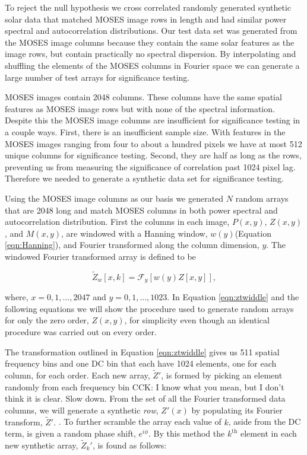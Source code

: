 \documentclass[]{solarphysics}
\newcommand{\cck}[1]{{\color{red} CCK: #1}} %
\begin{document}
\begin{article}
	To reject the null hypothesis we cross correlated randomly generated synthetic solar data that matched MOSES image rows in length and had similar power spectral and autocorrelation distributions.  Our test data set was generated from the MOSES image columns because they contain the same solar features as the image rows, but contain practically no spectral dispersion.  By interpolating and shuffling the elements of the MOSES columns in Fourier space we can generate a large number of test arrays for significance testing.
	
	MOSES images contain 2048 columns.  These columns have the same spatial features as MOSES image rows but with none of the spectral information.  Despite this the MOSES image columns are insufficient for significance testing in a couple ways.  First, there is an insufficient sample size.  With features in the MOSES images ranging from four to about a hundred pixels we have at most 512 unique columns for significance testing.  Second, they are half as long as the rows, preventing us from measuring the significance of correlation past 1024 pixel lag.  Therefore we needed to generate a synthetic data set for significance testing.
	
	Using the MOSES image columns as our basis we generated $N$ random arrays that are 2048 long and match MOSES columns in both power spectral and autocorrelation distribution.  First the columns in each image, $P(x,y)$, $Z(x,y)$, and $M(x,y)$, are windowed with a Hanning window, $w(y)$(Equation \ref{eqn:Hanning}), and Fourier transformed along the column dimension, $y$.  The windowed Fourier transformed array is defined to be
	
	\begin{equation}
		\widetilde{Z}_w[x,k] = \mathcal{F}_y\left[ w(y)Z[x,y]\right], 
		\label{eqn:ztwiddle}
	\end{equation}
   
	where, $ x = 0,1,...,2047$ and $y = 0,1,...,1023$.  In Equation \ref{eqn:ztwiddle} and the following equations we will show the procedure used to generate random arrays for only the zero order, $Z(x,y)$, for simplicity even though an identical procedure was carried out on every order.
	
	The transformation outlined in Equation \ref{eqn:ztwiddle} gives us 511 spatial frequency bins and one DC bin that each have 1024 elements, one for each column, for each order.  Each new array, $\widetilde{Z}'$, is formed by picking an element randomly from each frequency bin \cck{I know what you mean, but I don't think it is clear. Slow down. From the set of all the Fourier transformed data columns, we will generate a synthetic \emph{row}, $Z'(x)$ by populating its Fourier transform, $\widetilde{Z}'$. }. To further scramble the array each value of $k$, aside from the DC term, is given a random phase shift, $e^{i\phi}$.  By this method the $k^{\mathrm{th}}$ element in each new synthetic array, $\widetilde{Z}_k'$, is found as follows:
	

\end{article}
\end{document}
